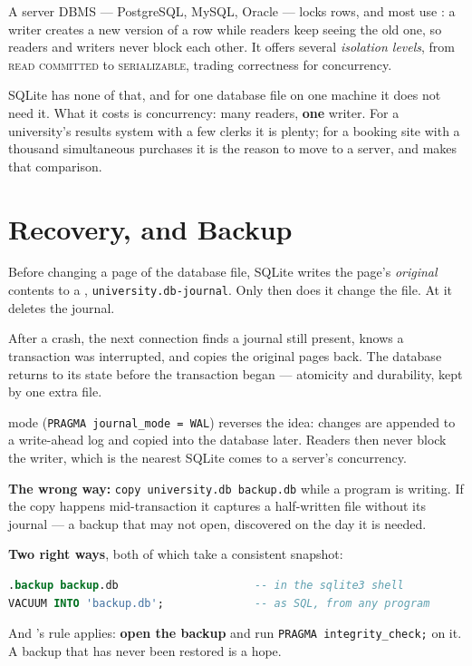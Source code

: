 \begin{conceptbox}
A server DBMS --- PostgreSQL, MySQL, Oracle --- locks rows, and most use
: a writer creates a new version of a
row while readers keep seeing the old one, so readers and writers never block
each other. It offers several \emph{isolation levels}, from \textsc{read
committed} to \textsc{serializable}, trading correctness for concurrency.

\smallskip
SQLite has none of that, and for one database file on one machine it does not
need it. What it costs is concurrency: many readers, \textbf{one} writer. For a
university's results system with a few clerks it is plenty; for a booking site
with a thousand simultaneous purchases it is the reason to move to a server,
and  makes that comparison.
\end{conceptbox}

\section{Recovery, and Backup}

\begin{definitionbox}
Before changing a page of the database file, SQLite writes the page's
\emph{original} contents to a , \texttt{university.db-journal}.
Only then does it change the file. At  it deletes the journal.

\smallskip
After a crash, the next connection finds a journal still present, knows a
transaction was interrupted, and copies the original pages back. The database
returns to its state before the transaction began --- atomicity and
durability, kept by one extra file.

\smallskip
{} mode (\texttt{PRAGMA journal\_mode = WAL}) reverses the idea:
changes are appended to a write-ahead log and copied into the database later.
Readers then never block the writer, which is the nearest SQLite comes to a
server's concurrency.
\end{definitionbox}

\begin{examplebox}
\textbf{The wrong way:} \texttt{copy university.db backup.db} while a program
is writing. If the copy happens mid-transaction it captures a half-written
file without its journal --- a backup that may not open, discovered on the day
it is needed.

\smallskip
\textbf{Two right ways}, both of which take a consistent snapshot:
\begin{lstlisting}[language=sql]
.backup backup.db                     -- in the sqlite3 shell
VACUUM INTO 'backup.db';              -- as SQL, from any program
\end{lstlisting}

\smallskip
And 's rule applies: \textbf{open the backup} and run
\texttt{PRAGMA integrity\_check;} on it. A backup that has never been restored
is a hope.
\end{examplebox}

